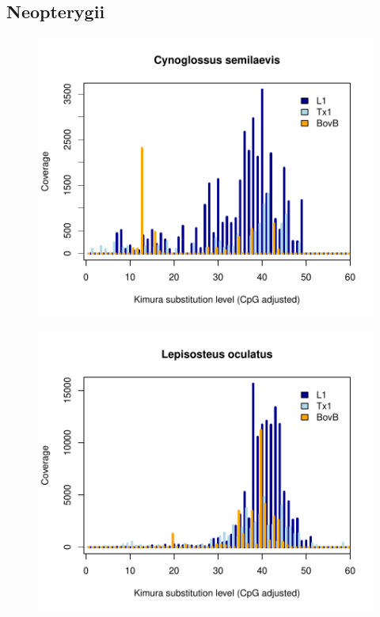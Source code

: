 \documentclass[12pt,a4paper,times]{article}
\begin{document}
\subsection*{Neopterygii}

\begin{figure}[H]
	\centering
	\includegraphics[scale=0.8]{suppFigures/divergencePlots/Cynoglossus_semilaevis.pdf}
	\caption{\label{Cynoglossus_semilaevis}}
\end{figure}

\begin{figure}[H]
	\centering
	\includegraphics[scale=0.8]{suppFigures/divergencePlots/Lepisosteus_oculatus.pdf}
	\caption{\label{Lepisosteus_oculatus}}
\end{figure}
\end{document}
